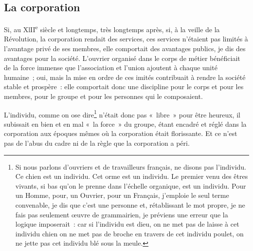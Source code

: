 \documentclass[french,twoside]{book} %
\begin{document}
\subsection[La corporation]{La corporation}
\noindent Si, au XlII\textsuperscript{e} siècle et longtemps, très longtemps après, si, à la veille de la Révolution, la corporation rendait des services, ces services n’étaient pas limités à l’avantage privé de ses membres, elle comportait des avantages publics, je dis des avantages pour la société. L’ouvrier organisé dans le corps de métier bénéficiait de la force immense que l’association et l’union ajoutent à chaque unité humaine ; oui, mais la mise en ordre de ces imités contribuait à rendre la société stable et prospère : elle comportait donc une discipline pour le corps et pour les membres, pour le groupe et pour les personnes qui le composaient.\par
L’individu, comme on ose dire\footnote{Si nous parlons d’ouvriers et de travailleurs français, ne disons pas l’individu. Ce chien est un individu. Cet orme est un individu. Le premier venu des êtres vivants, si bas qu’on le prenne dans l’échelle organique, est un individu. Pour un Homme, pour, un Ouvrier, pour un Français, j’emploie le seul terme convenable, je dis que c’est une personne et, rétablissant le mot propre, je ne fais pas seulement œuvre de grammairien, je préviens une erreur que la logique imposerait : car si l’individu est dieu, on ne met pas de laisse à cet individu chien on ne met pas de broche en travers de cet individu poulet, on ne jette pas cet individu blé sous la meule.} n’était donc pas « libre » pour être heureux, il subissait en bien et en mal « la force » du groupe, étant encadré et réglé dans la corporation aux époques mêmes où la corporation était florissante. Et ce n’est pas de l’abus du cadre ni de la règle que la corporation a péri.\par
\end{document}
